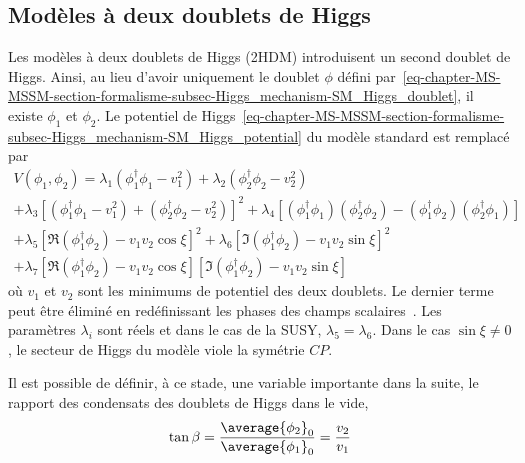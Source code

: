 \subsection{Modèles à deux doublets de Higgs}\label{chapter-MS-MSSM-section-BSM-subsec-dbl_H_dbl}
\par Les modèles à deux doublets de Higgs (2HDM) introduisent un second doublet de Higgs.
Ainsi, au lieu d'avoir uniquement le doublet $\phi$ défini par~\eqref{eq-chapter-MS-MSSM-section-formalisme-subsec-Higgs_mechanism-SM_Higgs_doublet}, il existe $\phi_1$ et $\phi_2$.
Le potentiel de Higgs~\eqref{eq-chapter-MS-MSSM-section-formalisme-subsec-Higgs_mechanism-SM_Higgs_potential} du modèle standard est remplacé par
\begin{multline}
V(\phi_1,\phi_2)
= \lambda_1 (\phi_1^\dagger\phi_1-v_1^2)
+ \lambda_2 (\phi_2^\dagger\phi_2-v_2^2)
\\
+ \lambda_3 \left[ (\phi_1^\dagger\phi_1-v_1^2) + (\phi_2^\dagger\phi_2-v_2^2) \right]^2
+ \lambda_4 \left[ (\phi_1^\dagger\phi_1)(\phi_2^\dagger\phi_2) - (\phi_1^\dagger\phi_2)(\phi_2^\dagger\phi_1) \right]
\\
+ \lambda_5 \left[ \Re(\phi_1^\dagger\phi_2) -v_1v_2\cos\xi \right]^2
+ \lambda_6 \left[ \Im(\phi_1^\dagger\phi_2) -v_1v_2\sin\xi \right]^2
\\
+ \lambda_7 \left[ \Re(\phi_1^\dagger\phi_2) -v_1v_2\cos\xi \right]\left[ \Im(\phi_1^\dagger\phi_2) -v_1v_2\sin\xi \right]
\label{eq-chapter-MS-MSSM-section-BSM-subsec-dbl_H_dbl-Higgs_potential}
\end{multline}
où $v_1$ et $v_2$ sont les minimums de potentiel des deux doublets.
Le dernier terme peut être éliminé en redéfinissant les phases des champs scalaires~\cite{Higgs_hunter_guide,Higgs_hunter_guide_errata}.
Les paramètres $\lambda_i$ sont réels et dans le cas de la SUSY, $\lambda_5=\lambda_6$.
Dans le cas $\sin\xi\neq0$, le secteur de Higgs du modèle viole la symétrie $CP$.
\par Il est possible de définir, à ce stade, une variable importante dans la suite, le rapport des condensats des doublets de Higgs dans le vide,
\begin{equation}
\tan\beta = \frac{\average{\phi_2}_0}{\average{\phi_1}_0} = \frac{v_2}{v_1}
\end{equation}
